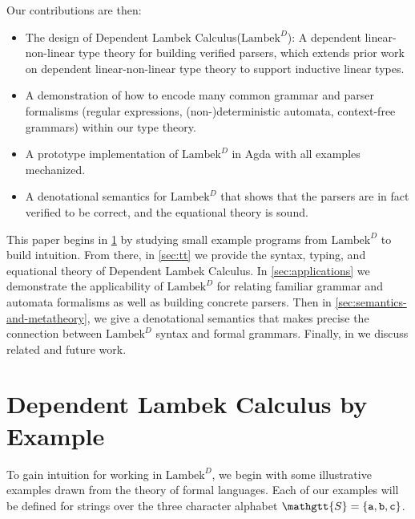 \documentclass[acmsmall,nonacm]{acmart}
\renewcommand{\Sigma}{\mathgtt{S}}
\newcommand{\theoryname}{Dependent Lambek Calculus\xspace}
\newcommand{\theoryabbv}{$\textrm{Lambek}^D$\xspace}
\begin{document}
Our contributions are then:
%
\begin{itemize}
  \item The design of \theoryname (\theoryabbv): A dependent
    linear-non-linear type theory for building verified parsers, which
    extends prior work on dependent linear-non-linear type theory to
    support inductive linear types.
  \item A demonstration of how to encode many common grammar and parser formalisms
    (regular expressions, (non-)deterministic automata, context-free
    grammars) within our type theory.
  \item A prototype implementation of \theoryabbv in Agda with all
    examples mechanized.
  \item A denotational semantics for \theoryabbv that shows that the
    parsers are in fact verified to be correct, and the equational theory is sound.
\end{itemize}

This paper begins in \cref{sec:type-theory-examples} by studying small
example programs from \theoryabbv to build intuition.  From there, in
\cref{sec:tt} we provide the syntax, typing, and equational theory of
\theoryname. In \cref{sec:applications} we demonstrate the
applicability of \theoryabbv for relating familiar grammar and
automata formalisms as well as building concrete parsers.  Then in
\cref{sec:semantics-and-metatheory}, we give a denotational semantics
that makes precise the connection between \theoryabbv syntax and
formal grammars. Finally, in  we discuss related
and future work.

\ifarxiv{}\fi

\section{\theoryname by Example}
\label{sec:type-theory-examples}
To gain intuition for working in \theoryabbv, we begin with some
illustrative examples drawn from the theory of formal languages. Each
of our examples will be defined for strings over the three character
alphabet $\Sigma = \{ \texttt{a} , \texttt{b}, \texttt{c} \}$.

\newcommand{\A}{\texttt{A}}
\newcommand{\B}{\texttt{B}}
\newcommand{\I}{\texttt{I}}
\newcommand{\f}{\texttt{f}}
\newcommand{\g}{\texttt{g}}
\renewcommand{\L}{\texttt{L}}
\renewcommand{\a}{\texttt{a}}
\renewcommand{\b}{\texttt{b}}
\renewcommand{\c}{\texttt{c}}
\newcommand{\w}{\texttt{w}}
\end{document}
